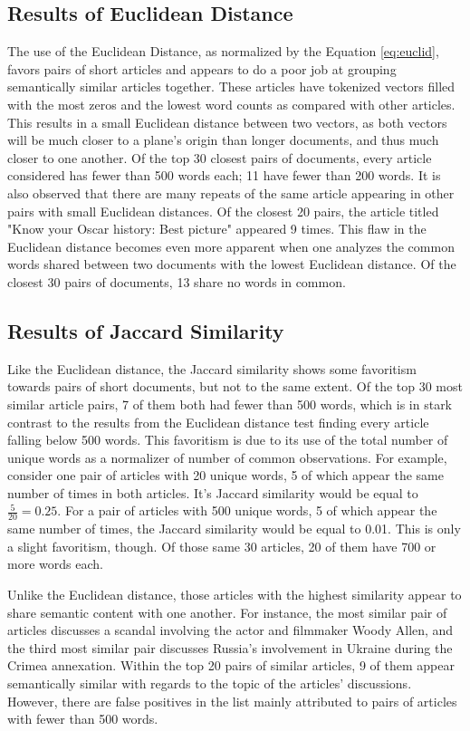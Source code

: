 \documentclass[11pt]{article}
\begin{document}
\subsection{Results of Euclidean Distance}
The use of the Euclidean Distance, as normalized by the Equation \ref{eq:euclid}, favors pairs of short articles and appears to do a poor job at grouping semantically similar articles together.
These articles have tokenized vectors filled with the most zeros and the lowest word counts as compared with other articles.
This results in a small Euclidean distance between two vectors, as both vectors will be much closer to a plane's origin than longer documents, and thus much closer to one another.
Of the top 30 closest pairs of documents, every article considered has fewer than 500 words each; 11 have fewer than 200 words.
It is also observed that there are many repeats of the same article appearing in other pairs with small Euclidean distances.
Of the closest 20 pairs, the article titled "Know your Oscar history: Best picture" appeared 9 times.
This flaw in the Euclidean distance becomes even more apparent when one analyzes the common words shared between two documents with the lowest Euclidean distance.
Of the closest 30 pairs of documents, 13 share no words in common.

\subsection{Results of Jaccard Similarity}

Like the Euclidean distance, the Jaccard similarity shows some favoritism towards pairs of short documents, but not to the same extent.
Of the top 30 most similar article pairs, 7 of them both had fewer than 500 words, which is in stark contrast to the results from the Euclidean distance test finding every article falling below 500 words.
This favoritism is due to its use of the total number of unique words as a normalizer of number of common observations.
For example, consider one pair of articles with 20 unique words, 5 of which appear the same number of times in both articles.
It's Jaccard similarity would be equal to $\frac{5}{20} = 0.25$.
For a pair of articles with 500 unique words, 5 of which appear the same number of times, the Jaccard similarity would be equal to 0.01.
This is only a slight favoritism, though.
Of those same 30 articles, 20 of them have 700 or more words each.

Unlike the Euclidean distance, those articles with the highest similarity appear to share semantic content with one another.
For instance, the most similar pair of articles discusses a scandal involving the actor and filmmaker Woody Allen, and the third most similar pair discusses Russia's involvement in Ukraine during the Crimea annexation.
Within the top 20 pairs of similar articles, 9 of them appear semantically similar with regards to the topic of the articles' discussions.
However, there are false positives in the list mainly attributed to pairs of articles with fewer than 500 words.
\end{document}
